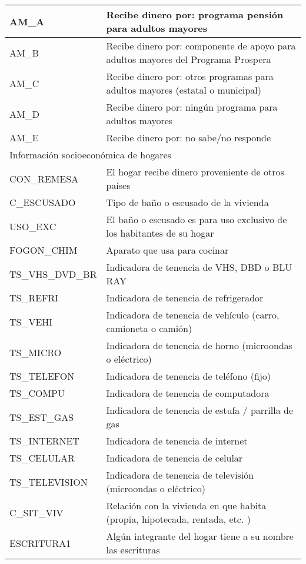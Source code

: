 \begin{longtable}{|p{8cm}|p{8cm}|}
    \hline
    AM\_A & Recibe dinero por: programa pensión para adultos mayores \\
    \hline
    AM\_B & Recibe dinero por: componente de apoyo para adultos mayores del Programa Prospera\\
    \hline
    AM\_C & Recibe dinero por: otros programas para adultos mayores (estatal o municipal)\\
    \hline
    AM\_D & Recibe dinero por: ningún programa para adultos mayores\\
    \hline
    AM\_E & Recibe dinero por: no sabe/no responde\\
    \hline
    \hline
    \multicolumn{2}{l}{Información socioeconómica de hogares}\\
    \hline
    CON\_REMESA & El hogar recibe dinero proveniente de otros países \\
    \hline
    C\_ESCUSADO & Tipo de baño o escusado de la vivienda \\
    \hline
    USO\_EXC & El baño o escusado es para uso exclusivo de los habitantes de su hogar \\
    \hline
    FOGON\_CHIM & Aparato que usa para cocinar \\
    \hline
    TS\_VHS\_DVD\_BR & Indicadora de tenencia de VHS, DBD o BLU RAY \\
    \hline
    TS\_REFRI & Indicadora de tenencia de refrigerador \\
    \hline
    TS\_VEHI & Indicadora de tenencia de vehículo (carro, camioneta o camión) \\
    \hline
    TS\_MICRO & Indicadora de tenencia de horno (microondas o eléctrico) \\
    \hline
    TS\_TELEFON & Indicadora de tenencia de teléfono (fijo) \\
    \hline
    TS\_COMPU & Indicadora de tenencia de computadora\\
    \hline
    TS\_EST\_GAS & Indicadora de tenencia de estufa / parrilla de gas\\
    \hline
    TS\_INTERNET & Indicadora de tenencia de internet\\
    \hline
    TS\_CELULAR & Indicadora de tenencia de celular\\
    \hline
    TS\_TELEVISION & Indicadora de tenencia de televisión (microondas o eléctrico) \\
    \hline
    C\_SIT\_VIV & Relación con la vivienda en que habita (propia, hipotecada, rentada, etc. ) \\
    \hline
    ESCRITURA1 & Algún integrante del hogar tiene a su nombre las escrituras \\

\end{longtable}
